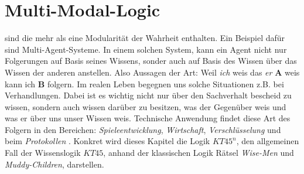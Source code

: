 

\chapter{Multi-Modal-Logic} %
\label{sec:multi_modal_logic}
\MML sind \NML die mehr als eine Modularität der Wahrheit enthalten.
Ein Beispiel dafür sind Multi-Agent-Systeme. 
In einem solchen System, kann ein Agent nicht nur Folgerungen auf Basis seines Wissens, sonder auch auf Basis des Wissen über das Wissen der anderen anstellen. 
Also Aussagen der Art: Weil \emph{ich} weis das \emph{er} \textbf{A} weis kann ich \textbf{B} folgern.
Im realen Leben begegnen uns solche Situationen z.B. bei Verhandlungen.
Dabei ist es wichtig nicht nur über den Sachverhalt bescheid zu wissen, sondern auch wissen darüber zu besitzen, was der Gegenüber weis und was er über uns unser Wissen weis.
Technische Anwendung findet diese Art des Folgern in den Bereichen: \emph{Spieleentwicklung}, \emph{Wirtschaft}, \emph{Verschlüsselung} und beim \emph{Protokollen} .
Konkret wird dieses Kapitel die Logik $KT45^n$, den allgemeinen Fall der Wissenslogik $KT45$, anhand der klassischen Logik Rätsel \emph{Wise-Men} und \emph{Muddy-Children}, darstellen.


%


